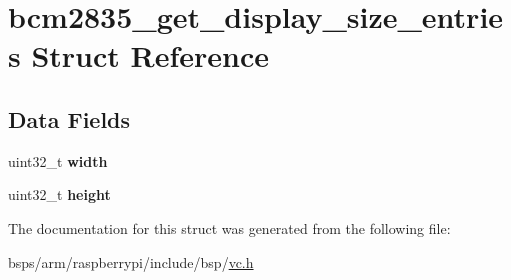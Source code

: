 \hypertarget{structbcm2835__get__display__size__entries}{}\section{bcm2835\+\_\+get\+\_\+display\+\_\+size\+\_\+entries Struct Reference}
\label{structbcm2835__get__display__size__entries}
\subsection*{Data Fields}
\begin{DoxyCompactItemize}
\item 
\mbox{\label{structbcm2835__get__display__size__entries_ae354a3e19b3f02223a75ea32736ec88d}} 
uint32\+\_\+t {\bfseries width}
\item 
\mbox{\label{structbcm2835__get__display__size__entries_aec63cd15be93d5605e9b19669bf005c1}} 
uint32\+\_\+t {\bfseries height}
\end{DoxyCompactItemize}


The documentation for this struct was generated from the following file\+:\begin{DoxyCompactItemize}
\item 
bsps/arm/raspberrypi/include/bsp/\mbox{\hyperlink{vc_8h}{vc.\+h}}\end{DoxyCompactItemize}
